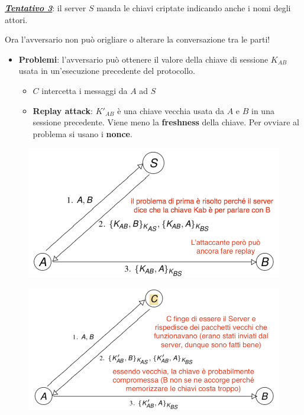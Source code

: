 \documentclass[11pt, a4paper, twoside, italian]{report}
\theoremstyle{plain}
\begin{document}
\noindent
\textbf{\textit{\underline{Tentativo 3}}}: il server $S$ manda le chiavi criptate indicando anche i nomi degli attori.
\begin{multicols}{1}
		\noindent
		Ora l'avversario non può origliare o alterare la conversazione tra le parti!
		\begin{itemize}
		\item \textbf{Problemi}: l'avversario può ottenere il valore della chiave di sessione $K_{AB}$ usata in un'esecuzione precedente del protocollo.
		\begin{itemize}
			\item $C$ intercetta i messaggi da $A$ ad $S$
			\item \textbf{Replay attack}: $K'_{AB}$ è una chiave vecchia usata da $A$ e $B$ in una sessione precedente. Viene meno la \textbf{freshness} della chiave. Per ovviare al problema si usano i \textbf{nonce}.
		\end{itemize}
	\end{itemize}
	\columnbreak
	\begin{figure}[H]
		\centering
		\includegraphics[scale=0.5]{attempt3}
	\end{figure}
	\begin{figure}[H]
		\centering
		\includegraphics[scale=0.5]{problem1attempt3}
	\end{figure}
\end{multicols}
	
\end{document}
